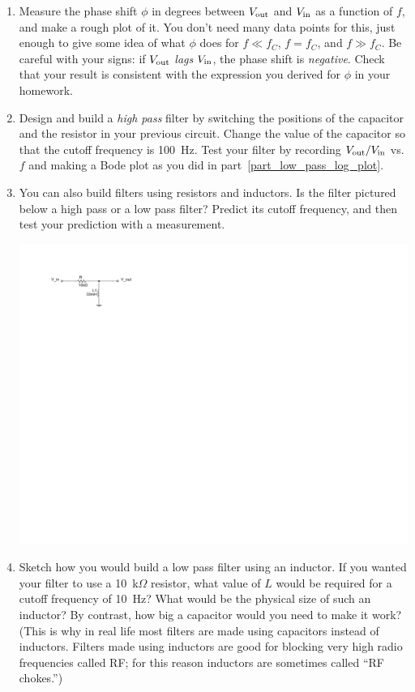\begin{enumerate}[wide]
\item Measure the phase shift $\phi$ in degrees between $V_{\rm out}$ and $V_{\rm in}$ as a function of $f$, and make a rough plot of it.  You don't need many data points for this, just enough to give some idea of what $\phi$ does for $f \ll f_C$, $f = f_C$, and $f \gg f_C$.  Be careful with your signs: if $V_{\rm out}$ \textit{lags} $V_{\rm in}$, the phase shift is \textit{negative}.  Check that your result is consistent with the expression you derived for $\phi$ in your homework.

\item Design and build a \textit{high pass} filter by switching the positions of the capacitor and the resistor in your previous circuit.  Change the value of the capacitor so that the cutoff frequency is 100~Hz.  Test your filter by recording $V_{\rm out}/V_{\rm in}$ vs. $f$ and making a Bode plot as you did in part~\ref{part_low_pass_log_plot}.  \label{part_high_pass_RC}

\item You can also build filters using resistors and inductors.  Is the filter pictured below a high pass or a low pass filter?  Predict its cutoff frequency, and then test your prediction with a measurement. \label{part_high_pass_RL}
\begin{center}
\includegraphics{filters/high_pass_filter_LR.pdf}
\end{center}

\item Sketch how you would build a low pass filter using an inductor.  If you wanted your filter to use a 10~k$\Omega$ resistor, what value of $L$ would be required for a cutoff frequency of 10~Hz?  What would be the physical size of such an inductor?  By contrast, how big a capacitor would you need to make it work?  (This is why in real life most filters are made using capacitors instead of inductors.  Filters made using inductors are good for blocking very high radio frequencies called RF; for this reason inductors are sometimes called ``RF chokes.'')  \label{part_low_pass_RL}


\end{enumerate}

